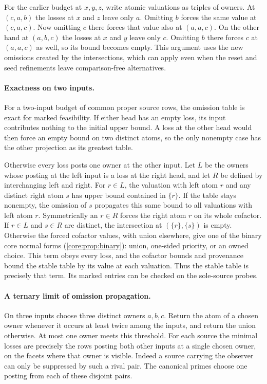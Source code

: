 For the earlier budget at $x,y,z$, write atomic
valuations as triples of owners. At $(c,a,b)$ the
losses at $x$ and $z$ leave only $a$. Omitting $b$
forces the same value at $(c,a,c)$. Now omitting
$c$ there forces that value also at $(a,a,c)$.
On the other hand at $(a,b,c)$ the losses at $x$
and $y$ leave only $c$. Omitting $b$ there forces
$c$ at $(a,a,c)$ as well, so its bound becomes
empty. This argument uses the new omissions
created by the intersections, which can apply
even when the reset and seed refinements leave
comparison-free alternatives.

\paragraph{Exactness on two inputs.}
For a two-input budget of common proper source rows,
the omission table is exact for marked feasibility.
If either head has an empty loss, its input contributes
nothing to the initial upper bound. A loss at the
other head would then force an empty bound on two
distinct atoms, so the only nonempty case has the
other projection as its greatest table.

Otherwise every loss posts one owner at the other
input. Let $L$ be the owners whose posting at the
left input is a loss at the right head, and let $R$
be defined by interchanging left and right. For
$r\in L$, the valuation with left atom $r$ and any
distinct right atom $s$ has upper bound contained
in $\{r\}$. If the table stays nonempty, the
omission of $s$ propagates this same bound to all
valuations with left atom $r$. Symmetrically an
$r\in R$ forces the right atom $r$ on its whole
cofactor. If $r\in L$ and $s\in R$ are distinct,
the intersection at $(\{r\},\{s\})$ is empty.
Otherwise the forced cofactor values, with union
elsewhere, give one of the binary core normal forms
(\cref{core:prop:binary}): union, one-sided
priority, or an owned choice. This term obeys
every loss, and the cofactor bounds and provenance
bound the stable table by its value at each
valuation. Thus the stable table is precisely
that term. Its marked entries can be checked on
the sole-source probes.

\paragraph{A ternary limit of omission propagation.}
On three inputs choose three distinct owners $a,b,c$.
Return the atom of a chosen owner whenever it occurs
at least twice among the inputs, and return the union
otherwise. At most one owner meets this threshold.
For each source the minimal losses are precisely the
rows posting both other inputs at a single chosen
owner, on the facets where that owner is visible.
Indeed a source carrying the observer can only be
suppressed by such a rival pair. The canonical primes
choose one posting from each of these disjoint pairs.

